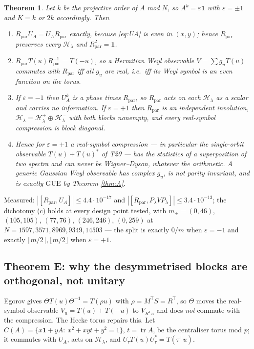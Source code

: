 \documentclass[11pt,reqno]{amsart}
\newtheorem{theorem}{Theorem}[section]
\theoremstyle{definition}
\DeclareMathOperator{\tr}{tr}
\newcommand{\HH}{\mathcal{H}}
\newcommand{\GUE}{\mathrm{GUE}}
\begin{document}
\begin{theorem}\label{thm:D}
Let $k$ be the projective order of $A$ mod $N$, so $A^k=\varepsilon\mathbf1$ with
$\varepsilon=\pm1$ and $K=k$ or $2k$ accordingly. Then
\begin{enumerate}
\item[(a)] $R_{\mathrm{par}}U_A=U_AR_{\mathrm{par}}$ exactly, because
  \eqref{eq:UA} is even in $(x,y)$; hence $R_{\mathrm{par}}$ preserves every
  $\HH_\lambda$ and $R_{\mathrm{par}}^2=\mathbf1$.
\item[(b)] $R_{\mathrm{par}}T(u)R_{\mathrm{par}}^{-1}=T(-u)$, so a Hermitian Weyl
  observable $V=\sum g_uT(u)$ commutes with $R_{\mathrm{par}}$ iff all $g_u$ are
  \emph{real}, i.e.\ iff its Weyl symbol is an \emph{even} function on the torus.
\item[(c)] If $\varepsilon=-1$ then $U_A^{k}$ is a phase times $R_{\mathrm{par}}$,
  so $R_{\mathrm{par}}$ acts on each $\HH_\lambda$ as a \emph{scalar} and carries
  no information. If $\varepsilon=+1$ then $R_{\mathrm{par}}$ is an independent
  involution, $\HH_\lambda=\HH_\lambda^+\oplus\HH_\lambda^-$ with both blocks
  nonempty, and every real-symbol compression is \emph{block diagonal}.
\item[(d)] Hence for $\varepsilon=+1$ a real-symbol compression --- in particular
  the single-orbit observable $T(u)+T(u)^*$ of T20 --- has the statistics of a
  \emph{superposition of two spectra} and can never be Wigner--Dyson, whatever
  the arithmetic. A generic Gaussian Weyl observable has complex $g_u$, is not
  parity invariant, and is exactly $\GUE$ by Theorem \ref{thm:A}.
\end{enumerate}
\end{theorem}

Measured: $|[R_{\mathrm{par}},U_A]|\le4.4\cdot10^{-17}$ and
$|[R_{\mathrm{par}},P_\lambda VP_\lambda]|\le3.4\cdot10^{-13}$; the dichotomy (c)
holds at every design point tested, with $m_\pm=(0,46)$, $(105,105)$, $(77,76)$,
$(246,246)$, $(0,259)$ at $N=1597,3571,8969,9349,14503$ --- the split is exactly
$0/m$ when $\varepsilon=-1$ and exactly $\lceil m/2\rceil,\lfloor m/2\rfloor$ when
$\varepsilon=+1$.

\subsection{Theorem E: why the desymmetrised blocks are orthogonal, not unitary}

Egorov gives $\Theta T(u)\Theta^{-1}=T(\rho u)$ with $\rho=M^{\mathsf T}S=
R^{\mathsf T}$, so $\Theta$ moves the real-symbol observable $V_u=T(u)+T(-u)$ to
$V_{R^{\mathsf T}u}$ and does \emph{not} commute with the compression. The Hecke
torus repairs this. Let $C(A)=\{x\mathbf1+yA:\ x^2+xyt+y^2=1\}$, $t=\tr A$, be the
centraliser torus mod $p$; it commutes with $U_A$, acts on $\HH_\lambda$, and
$U_\tau T(u)U_\tau^*=T(\tau^{\mathsf T}u)$.
\end{document}
